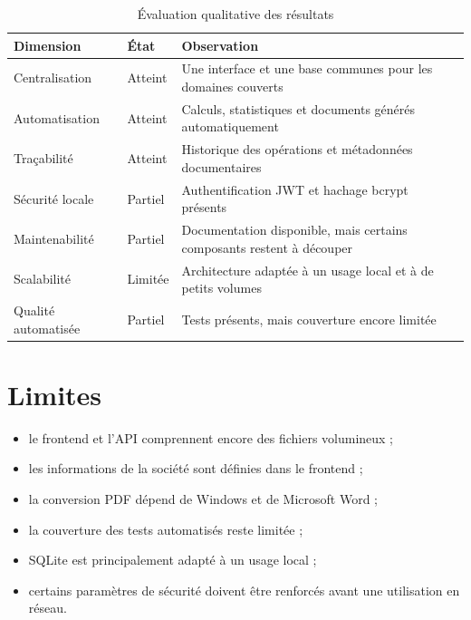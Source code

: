 \documentclass[12pt,a4paper,oneside]{report}
\begin{document}
\begin{table}[H]
\centering
\caption{Évaluation qualitative des résultats}
\begin{tabularx}{\textwidth}{Y p{3cm}Y}
\toprule
\textbf{Dimension} & \textbf{État} & \textbf{Observation}\\
\midrule
Centralisation
& Atteint
& Une interface et une base communes pour les domaines couverts\\

Automatisation
& Atteint
& Calculs, statistiques et documents générés automatiquement\\

Traçabilité
& Atteint
& Historique des opérations et métadonnées documentaires\\

Sécurité locale
& Partiel
& Authentification JWT et hachage bcrypt présents\\

Maintenabilité
& Partiel
& Documentation disponible, mais certains composants restent à découper\\

Scalabilité
& Limitée
& Architecture adaptée à un usage local et à de petits volumes\\

Qualité automatisée
& Partiel
& Tests présents, mais couverture encore limitée\\
\bottomrule
\end{tabularx}
\end{table}

\section{Limites}

\begin{itemize}
  \item le frontend et l'API comprennent encore des fichiers volumineux ;
  \item les informations de la société sont définies dans le frontend ;
  \item la conversion PDF dépend de Windows et de Microsoft Word ;
  \item la couverture des tests automatisés reste limitée ;
  \item SQLite est principalement adapté à un usage local ;
  \item certains paramètres de sécurité doivent être renforcés avant
        une utilisation en réseau.
\end{itemize}
\end{document}
